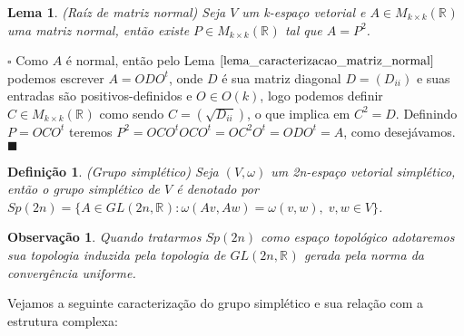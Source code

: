 \documentclass[12pt]{book}
\newtheorem{lema}[teorema]{Lema}
\newtheorem{definicao}[teorema]{Definição}
\newtheorem{observacao}[teorema]{Observação}
\newenvironment{prova}[1]{$\square$ #1}{\hfill$\blacksquare$}
\newcommand{\generalgroup}[2]{GL(#1, #2)}
\newcommand{\generalgroupreal}[1]{\generalgroup{#1}{\real{}}}
\newcommand{\gruposimpletico}[1]{Sp(#1)}
\newcommand{\matrizortogonal}[1]{O(#1)}
\newcommand{\matrizquadreal}[1]{M_{#1 \times #1}(\real{})}
\newcommand{\real}[1]{\mathbb{R}^{#1}}
\begin{document}
	
	\begin{lema}
		(Raíz de matriz normal) Seja $V$ um k-espaço vetorial e $A\in \matrizquadreal{k}$ uma matriz normal, então existe $P\in \matrizquadreal{k}$ tal que $A=P^{2}$. 
	\end{lema}
	\begin{prova}
		Como $A$ é normal, então pelo Lema $\ref{lema_caracterizacao_matriz_normal}$ podemos escrever $A=ODO^{t}$, onde  $D$ é sua matriz diagonal $D=(D_{ii})$ e suas entradas são positivos-definidos e $O\in \matrizortogonal{k}$, logo podemos definir $C \in \matrizquadreal{k}$ como sendo $C = (\sqrt{D_{ii}})$, o que implica em $C^{2} = D$. Definindo $P = OCO^{t}$ teremos $P^{2} = OCO^{t}OCO^{t} = OC^{2}O^{t} = ODO^{t}=A$, como desejávamos.
	\end{prova}
	
	\begin{definicao}
		(Grupo simplético) Seja $(V,\omega)$ um 2n-espaço vetorial simplético, então o grupo simplético de $V$ é denotado por $\gruposimpletico{2n} = \{A \in \generalgroupreal{2n}: \omega(Av, Aw) = \omega(v, w), \; v,w \in V \}$.
	\end{definicao}
	
	\begin{observacao}
		Quando tratarmos $\gruposimpletico{2n}$ como espaço topológico adotaremos sua topologia induzida pela topologia de $\generalgroupreal{2n}$ gerada pela norma da convergência uniforme.
	\end{observacao}
	
	Vejamos a seguinte caracterização do grupo simplético e sua relação com a estrutura complexa:
	
\end{document}
